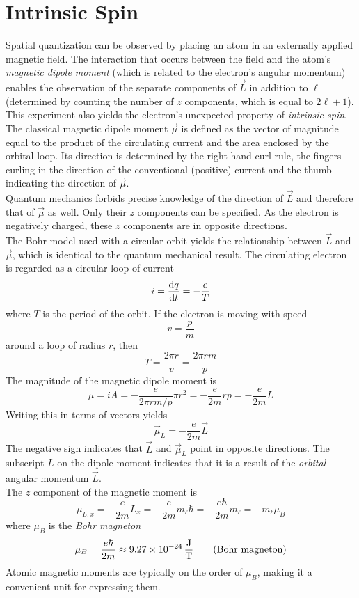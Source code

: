 \documentclass{subfiles}
\begin{document}
	\section{Intrinsic Spin}
		Spatial quantization can be observed by placing an atom in an externally applied magnetic field. The interaction that occurs between the field and the atom's \textit{magnetic dipole moment} (which is related to the electron's angular momentum) enables the observation of the separate components of \(\vec{L}\) in addition to \(\ell\) (determined by counting the number of \(z\) components, which is equal to \(2\ell + 1\)). This experiment also yields the electron's unexpected property of \textit{intrinsic spin}.
			The classical magnetic dipole moment \(\vec{\mu}\) is defined as the vector of magnitude equal to the product of the circulating current and the area enclosed by the orbital loop. Its direction is determined by the right-hand curl rule, the fingers curling in the direction of the conventional (positive) current and the thumb indicating the direction of \(\vec{\mu}\). \\
			Quantum mechanics forbids precise knowledge of the direction of \(\vec{L}\) and therefore that of \(\vec{\mu}\) as well. Only their \(z\) components can be specified. As the electron is negatively charged, these \(z\) components are in opposite directions. \\
			The Bohr model used with a circular orbit yields the relationship between \(\vec{L}\) and \(\vec{\mu}\), which is identical to the quantum mechanical result. The circulating electron is regarded as a circular loop of current
				\[
					i = \dv{q}{t}
						= -\frac{e}{T}
				\]
				where \(T\) is the period of the orbit. If the electron is moving with speed
				\[v = \frac{p}{m}\]
				around a loop of radius \(r\), then
				\[
					T = \frac{2\pi r}{v}
						= \frac{2\pi rm}{p}
				\]
				The magnitude of the magnetic dipole moment is
				\[
					\mu = iA
						= -\frac{e}{2\pi rm/p}\pi r^2
						= -\frac{e}{2m}rp
						= -\frac{e}{2m}L
				\]
				Writing this in terms of vectors yields
				\[\vec{\mu}_L = -\frac{e}{2m}\vec{L}\]
				The negative sign indicates that \(\vec{L}\) and \(\vec{\mu}_L\) point in opposite directions. The subscript \(L\) on the dipole moment indicates that it is a result of the \textit{orbital} angular momentum \(\vec{L}\). \\
				The \(z\) component of the magnetic moment is
				\[
					\mu_{L, x} = -\frac{e}{2m}L_x
						= -\frac{e}{2m}m_\ell\hbar
						= -\frac{e\hbar}{2m}m_\ell
						= -m_\ell\mu_B
				\]
				where \(\mu_B\) is the \textit{Bohr magneton}
				\[
					\mu_B = \frac{e\hbar}{2m} 
						\approx \SI{9.27E-24}{\frac{J}{T}}
						\tag{Bohr magneton}
				\]
				Atomic magnetic moments are typically on the order of \(\mu_B\), making it a convenient unit for expressing them.
\end{document}
